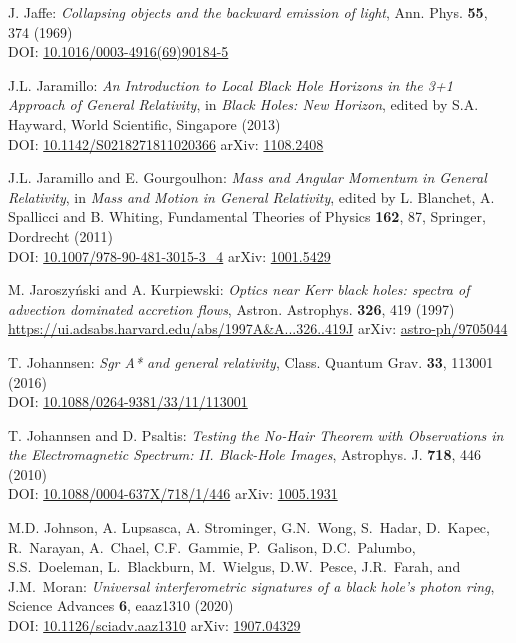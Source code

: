 \begin{thebibliography}{123}
J. Jaffe:
{\em Collapsing objects and the backward emission of light},
Ann. Phys. {\bf 55}, 374 (1969)\\
DOI: \href{https://doi.org/10.1016/0003-4916(69)90184-5}{10.1016/0003-4916(69)90184-5}

J.L. Jaramillo: {\em An Introduction to Local Black Hole Horizons in the 3+1
Approach of General Relativity}, in {\em Black Holes: New Horizon}, edited
by S.A. Hayward, World Scientific, Singapore (2013)\\
DOI: \href{https://doi.org/10.1142/S0218271811020366}{10.1142/S0218271811020366}\hfill
arXiv: \href{https://arxiv.org/abs/1108.2408}{1108.2408}

J.L. Jaramillo and E. Gourgoulhon:
{\em Mass and Angular Momentum in General Relativity},
in \emph{Mass and Motion in General Relativity}, edited by L. Blanchet, A. Spallicci and B. Whiting, Fundamental Theories of Physics {\bf 162}, 87,
Springer, Dordrecht (2011) \\
DOI: \href{https://doi.org/10.1007/978-90-481-3015-3_4}{10.1007/978-90-481-3015-3\_4}\hfill
arXiv: \href{https://arxiv.org/abs/1001.5429}{1001.5429}

M. Jaroszy\'nski and A. Kurpiewski:
{\em Optics near Kerr black holes: spectra of advection dominated accretion flows},
Astron. Astrophys. {\bf 326}, 419 (1997)\\
\url{https://ui.adsabs.harvard.edu/abs/1997A&A...326..419J}\hfill
arXiv: \href{https://arxiv.org/abs/astro-ph/9705044}{astro-ph/9705044}

T. Johannsen:
{\em Sgr A* and general relativity},
Class. Quantum Grav.  {\bf 33}, 113001 (2016)\\
DOI: \href{https://doi.org/10.1088/0264-9381/33/11/113001}{10.1088/0264-9381/33/11/113001}

T. Johannsen and D. Psaltis:
{\em Testing the No-Hair Theorem with Observations in the Electromagnetic Spectrum: II. Black-Hole Images},
Astrophys. J. {\bf 718}, 446 (2010)\\
DOI: \href{https://doi.org/10.1088/0004-637X/718/1/446}{10.1088/0004-637X/718/1/446}\hfill
arXiv: \href{https://arxiv.org/abs/1005.1931}{1005.1931}

M.D. Johnson, A. Lupsasca, A. Strominger, G.N.~Wong, S.~Hadar, D.~Kapec, R.~Narayan, A.~Chael,
C.F.~Gammie, P.~Galison, D.C.~Palumbo, S.S.~Doeleman, L.~Blackburn, M.~Wielgus, D.W.~Pesce,
J.R.~Farah, and J.M.~Moran:
{\em Universal interferometric signatures of a black hole's photon ring},
Science Advances {\bf 6}, eaaz1310 (2020)\\
DOI: \href{https://doi.org/10.1126/sciadv.aaz1310}{10.1126/sciadv.aaz1310}\hfill
arXiv: \href{https://arxiv.org/abs/1907.04329}{1907.04329}


\end{thebibliography}
